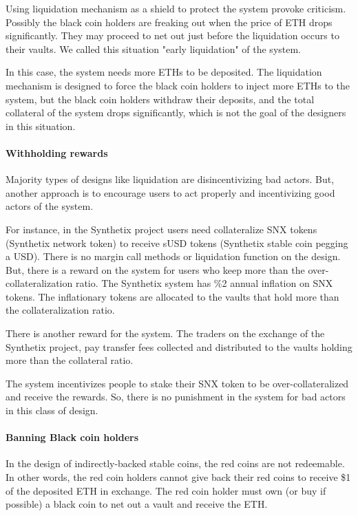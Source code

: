 \documentclass[runningheads]{llncs}
\begin{document}
Using liquidation mechanism as a shield to protect the system provoke criticism. Possibly the black coin holders are freaking out when the price of ETH drops significantly. They may proceed to net out just before the liquidation occurs to their vaults. We called this situation "early liquidation" of the system. 

In this case, the system needs more ETHs to be deposited. The liquidation mechanism is designed to force the black coin holders to inject more ETHs to the system, but the black coin holders withdraw their deposits, and the total collateral of the system drops significantly, which is not the goal of the designers in this situation.

\paragraph{Withholding rewards}

Majority types of designs like liquidation are disincentivizing bad actors. But, another approach is to encourage users to act properly and incentivizing good actors of the system.

For instance, in the Synthetix project users need collateralize SNX tokens (Synthetix network token) to receive sUSD tokens (Synthetix stable coin pegging a USD). There is no margin call methods or liquidation function on the design. But, there is a reward on the system for users who keep more than the over-collateralization ratio. 
The Synthetix system has \%2 annual inflation on SNX tokens. The inflationary tokens are allocated to the vaults that hold more than the collateralization ratio.

There is another reward for the system. The traders on the exchange of the Synthetix project, pay transfer fees collected and distributed to the vaults holding more than the collateral ratio.

The system incentivizes people to stake their SNX token to be over-collateralized and receive the rewards. So, there is no punishment in the system for bad actors in this class of design.

\paragraph{Banning Black coin holders}

In the design of indirectly-backed stable coins, the red coins are not redeemable. In other words, the red coin holders cannot give back their red coins to receive \$1 of the deposited ETH in exchange. The red coin holder must own (or buy if possible) a black coin to net out a vault and receive the ETH.
\end{document}
